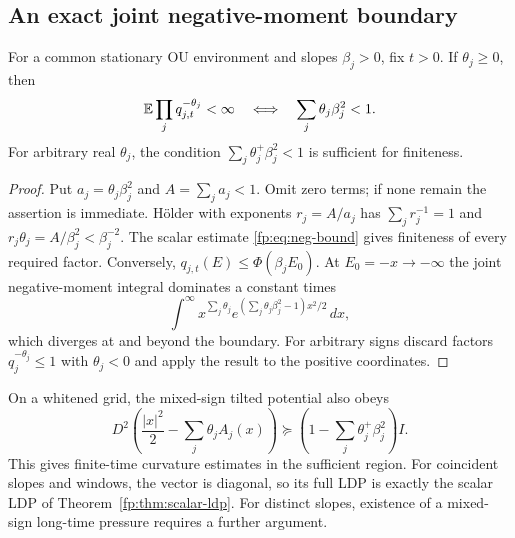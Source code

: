 \subsection{An exact joint negative-moment boundary}
\begin{proposition}\label{fp:prop:joint-negative-domain}
For a common stationary OU environment and slopes $\beta_j>0$, fix $t>0$. If $\theta_j\ge0$, then
\begin{equation}\label{fp:eq:joint-negative-domain}
 \mathbb E\prod_jq_{j,t}^{-\theta_j}<\infty
 \quad\Longleftrightarrow\quad
 \sum_j\theta_j\beta_j^2<1.
\end{equation}
For arbitrary real $\theta_j$, the condition
$\sum_j\theta_j^+\beta_j^2<1$ is sufficient for finiteness.
\end{proposition}
\begin{proof}
Put $a_j=\theta_j\beta_j^2$ and $A=\sum_ja_j<1$. Omit zero terms; if none remain the assertion is immediate. H\"older with exponents $r_j=A/a_j$ has $\sum_jr_j^{-1}=1$ and $r_j\theta_j=A/\beta_j^2<\beta_j^{-2}$. The scalar estimate \eqref{fp:eq:neg-bound} gives finiteness of every required factor. Conversely, $q_{j,t}(E)\le\Phi(\beta_jE_0)$. At $E_0=-x\to-\infty$ the joint negative-moment integral dominates a constant times
\[
 \int^\infty x^{\sum_j\theta_j}
 e^{(\sum_j\theta_j\beta_j^2-1)x^2/2}\,dx,
\]
which diverges at and beyond the boundary. For arbitrary signs discard factors $q_j^{-\theta_j}\le1$ with $\theta_j<0$ and apply the result to the positive coordinates.
\end{proof}

On a whitened grid, the mixed-sign tilted potential also obeys
\[
 D^2\left(\frac{|x|^2}{2}-\sum_j\theta_jA_j(x)\right)
 \succeq\left(1-\sum_j\theta_j^+\beta_j^2\right)I.
\]
This gives finite-time curvature estimates in the sufficient region.
For coincident slopes and windows, the vector is diagonal, so its full
LDP is exactly the scalar LDP of Theorem~\ref{fp:thm:scalar-ldp}.
For distinct slopes, existence of a mixed-sign long-time pressure
requires a further argument.

